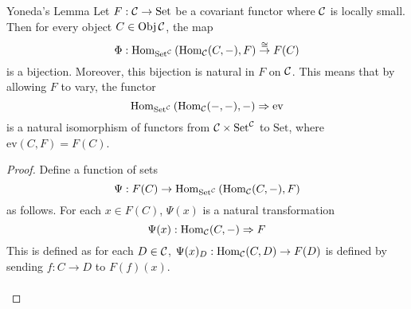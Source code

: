 \documentclass[a4paper]{article}
\begin{document}
\begin{thm}{Yoneda's Lemma}{} Let $F:\mathcal{C}\to\text{Set}$ be a covariant functor where $\mathcal{C}$ is locally small. Then for every object $C\in\operatorname{Obj}\mathcal{C}$, the map $$\Phi:\operatorname{Hom}_{\text{Set}^{\mathcal{C}}}\left(\operatorname{Hom}_{\mathcal{C}}(C,-),F\right)\overset{\cong}{\rightarrow}F(C)$$ is a bijection. Moreover, this bijection is natural in $F$ on $\mathcal{C}$. This means that by allowing $F$ to vary, the functor $$\operatorname{Hom}_{\text{Set}^{\mathcal{C}}}\left(\operatorname{Hom}_{\mathcal{C}}(-,-),-\right)\Rightarrow\text{ev}$$ is a natural isomorphism of functors from $\mathcal{C}\times\text{Set}^{\mathcal{C}}$ to $\text{Set}$, where $\text{ev}(C,F)=F(C)$. \tcbline
\begin{proof}
Define a function of sets $$\Psi:F(C)\to\operatorname{Hom}_{\text{Set}^{\mathcal{C}}}\left(\operatorname{Hom}_{\mathcal{C}}(C,-),F\right)$$ as follows. For each $x\in F(C)$, $\Psi(x)$ is a natural transformation $$\Psi(x):\operatorname{Hom}_{\mathcal{C}}(C,-)\Rightarrow F$$ This is defined as for each $D\in\mathcal{C}$, $\Psi(x)_D:\operatorname{Hom}_{\mathcal{C}}(C,D)\to F(D)$ is defined by sending $f:C\to D$ to $F(f)(x)$. \\~\\


\end{proof}
\end{thm}
\end{document}
